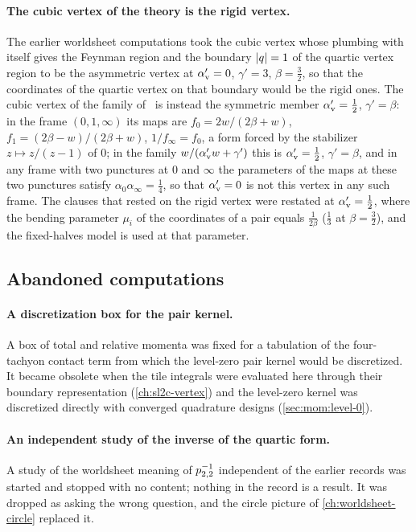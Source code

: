 \paragraph{The cubic vertex of the theory is the rigid vertex.}
The earlier worldsheet computations took the cubic vertex whose plumbing with itself gives the Feynman region and the boundary ${|q|} = 1$ of the quartic vertex region to be the asymmetric vertex at $\alpha'_{\rm v} = 0$, $\gamma' = 3$, $\beta = \tfrac{3}{2}$, so that the coordinates of the quartic vertex on that boundary would be the rigid ones.
The cubic vertex of the family of~\cite{Erbin:2026:SL2CVerticesClosed} is instead the symmetric member $\alpha'_{\rm v} = \tfrac{1}{2}$, $\gamma' = \beta$: in the frame $(0, 1, \infty)$ its maps are $f_0 = 2 w / (2 \beta + w)$, $f_1 = (2 \beta - w) / (2 \beta + w)$, $1 / f_\infty = f_0$, a form forced by the stabilizer $z \mapsto z / (z - 1)$ of $0$; in the family $w / (\alpha'_{\rm v} w + \gamma')$ this is $\alpha'_{\rm v} = \tfrac{1}{2}$, $\gamma' = \beta$, and in any frame with two punctures at $0$ and $\infty$ the parameters of the maps at these two punctures satisfy $\alpha_0 \alpha_\infty = \tfrac{1}{4}$, so that $\alpha'_{\rm v} = 0$ is not this vertex in any such frame.
The clauses that rested on the rigid vertex were restated at $\alpha'_{\rm v} = \tfrac{1}{2}$, where the bending parameter $\mu_i$ of the coordinates of a pair equals $\tfrac{1}{2 \beta}$ ($\tfrac{1}{3}$ at $\beta = \tfrac{3}{2}$), and the fixed-halves model is used at that parameter.

\subsection{Abandoned computations}

\paragraph{A discretization box for the pair kernel.}
A box of total and relative momenta was fixed for a tabulation of the four-tachyon contact term from which the level-zero pair kernel would be discretized.
It became obsolete when the tile integrals were evaluated here through their boundary representation (\cref{ch:sl2c-vertex}) and the level-zero kernel was discretized directly with converged quadrature designs (\cref{sec:mom:level-0}).

\paragraph{An independent study of the inverse of the quartic form.}
A study of the worldsheet meaning of $p_{2,2}^{-1}$ independent of the earlier records was started and stopped with no content; nothing in the record is a result.
It was dropped as asking the wrong question, and the circle picture of \cref{ch:worldsheet-circle} replaced it.
